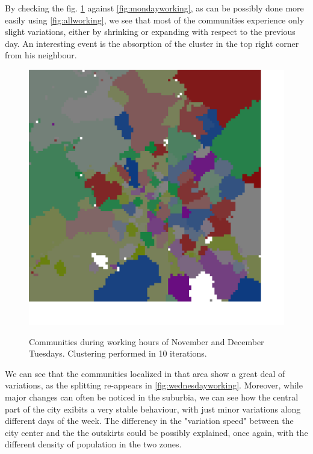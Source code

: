 \documentclass[12pt,a4paper]{article}
\begin{document}
By checking the fig. \ref{fig:tuesdayworking} against \ref{fig:mondayworking}, as can be possibly done more easily using \ref{fig:allworking},
we see that most of the communities experience only slight variations, either by shrinking or expanding with respect to the previous day.
An interesting event is the absorption of the cluster in the top right corner from his neighbour.
\begin{figure}[H]
\includegraphics[width=\linewidth]{week/2Tue.png}
\label{fig:tuesdayworking}
\caption{Communities during working hours of November and December Tuesdays. Clustering performed in 10 iterations.}
\end{figure}
We can see that the communities localized in that area show a great deal of variations, as the splitting re-appears in \ref{fig:wednesdayworking}.
Moreover, while major changes can often be noticed in the suburbia, we can see how the central part of the city exibits a very stable behaviour, with just minor variations along different days of the week.
The differency in the "variation speed" between the city center and the the outskirts could be possibly explained, once again, with the different density of population in the two zones.
\end{document}

